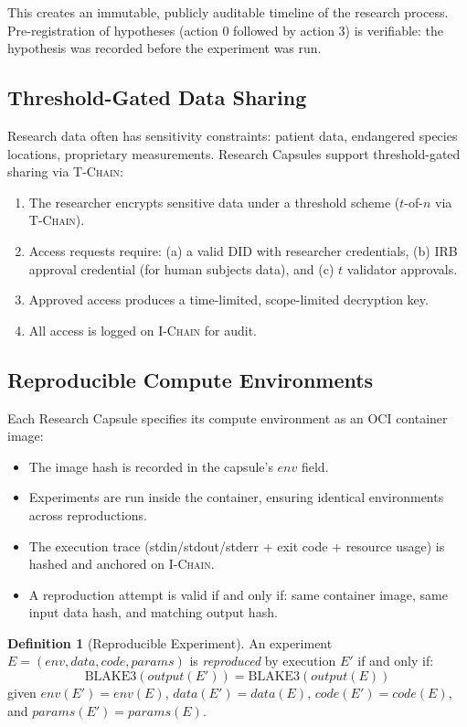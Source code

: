 \documentclass[11pt,letterpaper]{article}
\theoremstyle{definition}
\newtheorem{definition}{Definition}
\theoremstyle{remark}
\newcommand{\IChain}{\textsc{I-Chain}}
\newcommand{\TChain}{\textsc{T-Chain}}
\newcommand{\DID}{\textsc{DID}}
\begin{document}
This creates an immutable, publicly auditable timeline of the research process. Pre-registration of hypotheses (action 0 followed by action 3) is verifiable: the hypothesis was recorded before the experiment was run.

\subsection{Threshold-Gated Data Sharing}

Research data often has sensitivity constraints: patient data, endangered species locations, proprietary measurements. Research Capsules support threshold-gated sharing via \TChain{}:

\begin{enumerate}
    \item The researcher encrypts sensitive data under a threshold scheme ($t$-of-$n$ via \TChain{}).
    \item Access requests require: (a) a valid \DID{} with researcher credentials, (b) IRB approval credential (for human subjects data), and (c) $t$ validator approvals.
    \item Approved access produces a time-limited, scope-limited decryption key.
    \item All access is logged on \IChain{} for audit.
\end{enumerate}

\subsection{Reproducible Compute Environments}

Each Research Capsule specifies its compute environment as an OCI container image:

\begin{itemize}
    \item The image hash is recorded in the capsule's $\textit{env}$ field.
    \item Experiments are run inside the container, ensuring identical environments across reproductions.
    \item The execution trace (stdin/stdout/stderr + exit code + resource usage) is hashed and anchored on \IChain{}.
    \item A reproduction attempt is valid if and only if: same container image, same input data hash, and matching output hash.
\end{itemize}

\begin{definition}[Reproducible Experiment]
An experiment $E = (\textit{env}, \textit{data}, \textit{code}, \textit{params})$ is \emph{reproduced} by execution $E'$ if and only if:
\begin{equation}
\text{BLAKE3}(\textit{output}(E')) = \text{BLAKE3}(\textit{output}(E))
\end{equation}
given $\textit{env}(E') = \textit{env}(E)$, $\textit{data}(E') = \textit{data}(E)$, $\textit{code}(E') = \textit{code}(E)$, and $\textit{params}(E') = \textit{params}(E)$.
\end{definition}
\end{document}
